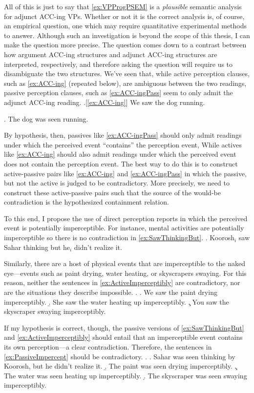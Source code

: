\documentclass[MilwayThesis]{subfiles}
\begin{document}
All of this is just to say that \cref{ex:VPProgPSEM} is a \textit{plausible} semantic analysis for adjunct ACC-ing VPs.
Whether or not it is the correct analysis is, of course, an empirical question, one which may require quantitative experimental methods to answer.
Although such an investigation is beyond the scope of this thesis, I can make the question more precise.
The question comes down to a contrast between how argument ACC-ing structures and adjunct ACC-ing structures are interpreted, respectively, and therefore asking the question will require us to disambiguate the two structures.
We've seen that, while active perception clauses, such as \cref{ex:ACC-ing} (repeated below), are ambiguous between the two readings, passive perception clauses, such as \cref{ex:ACC-ingPass} seem to only admit the adjunct ACC-ing reading.
\ex.[\cref{ex:ACC-ing}] We saw the dog running.

\ex.\label{ex:ACC-ingPass} The dog was seen running.

By hypothesis, then, passives like \cref{ex:ACC-ingPass} should only admit readings under which the perceived event ``contains'' the perception event, While actives like \cref{ex:ACC-ing} should also admit readings under which the perceived event does not contain the perception event.
The best way to do this is to construct active-passive pairs like \cref{ex:ACC-ing} and \cref{ex:ACC-ingPass} in which the passive, but not the active is judged to be contradictory.
More precisely, we need to construct these active-passive pairs such that the source of the would-be contradiction is the hypothesized containment relation.

To this end, I propose the use of direct perception reports in which the perceived event is potentially imperceptible.
For instance, mental activities are potentially imperceptible so there is no contradiction in \cref{ex:SawThinkingBut}.
\ex.\label{ex:SawThinkingBut} Koorosh$_{i}$ saw Sahar thinking but he$_{i}$ didn't realize it.

Similarly, there are a host of physical events that are imperceptible to the naked eye---events such as paint drying, water heating, or skyscrapers swaying.
For this reason, neither the sentences in \cref{ex:ActiveImperceptibly} are contradictory, nor are the situations they describe impossible.
\ex.\label{ex:ActiveImperceptibly}
\a. We saw the paint drying imperceptibly.
\b. She saw the water heating up imperceptibly.
\c. You saw the skyscraper swaying imperceptibly.

If my hypothesis is correct, though, the passive versions of \cref{ex:SawThinkingBut} and \cref{ex:ActiveImperceptibly} should entail that an imperceptible event contains its own perception---a clear contradiction.
Therefore, the sentences in \cref{ex:PassiveImpercept} should be contradictory.
\ex.\label{ex:PassiveImpercept} 
\a. Sahar was seen thinking by Koorosh, but he didn't realize it.
\b. The paint was seen drying imperceptibly.
\c. The water was seen heating up imperceptibly.
\d. The skyscraper was seen swaying imperceptibly.
\end{document}
